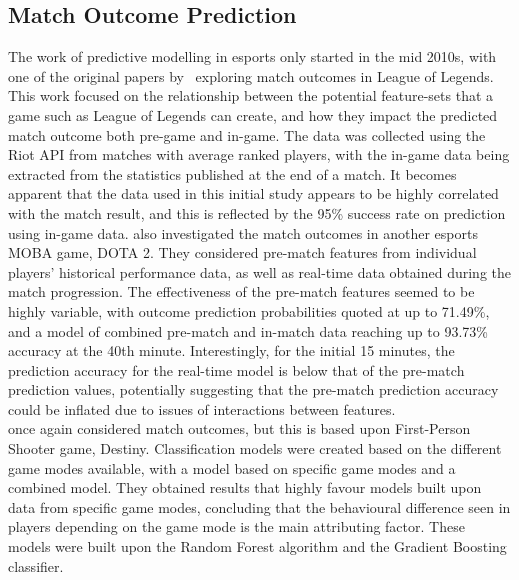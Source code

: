 \subsection{Match Outcome Prediction}\label{subsec:Match Outcome Prediction}
The work of predictive modelling in esports only started in the mid 2010s, with one of the original papers by~\citet{lin2016league} exploring match outcomes in League of Legends.
This work focused on the relationship between the potential feature-sets that a game such as League of Legends can create, and how they impact the predicted match outcome both pre-game and in-game.
The data was collected using the Riot API from matches with average ranked players, with the in-game data being extracted from the statistics published at the end of a match.
It becomes apparent that the data used in this initial study appears to be highly correlated with the match result, and this is reflected by the 95\% success rate on prediction using in-game data.
\citet{yang2016real} also investigated the match outcomes in another esports MOBA game, DOTA 2.
They considered pre-match features from individual players' historical performance data, as well as real-time data obtained during the match progression.
The effectiveness of the pre-match features seemed to be highly variable, with outcome prediction probabilities quoted at up to 71.49\%, and a model of combined pre-match and in-match data reaching up to 93.73\% accuracy at the 40th minute.
Interestingly, for the initial 15 minutes, the prediction accuracy for the real-time model is below that of the pre-match prediction values, potentially suggesting that the pre-match prediction accuracy could be inflated due to issues of interactions between features. \\

\citet{ravari2017predicting} once again considered match outcomes, but this is based upon First-Person Shooter game, Destiny.
Classification models were created based on the different game modes available, with a model based on specific game modes and a combined model.
They obtained results that highly favour models built upon data from specific game modes, concluding that the behavioural difference seen in players depending on the game mode is the main attributing factor.
These models were built upon the Random Forest algorithm and the Gradient Boosting classifier. \\

